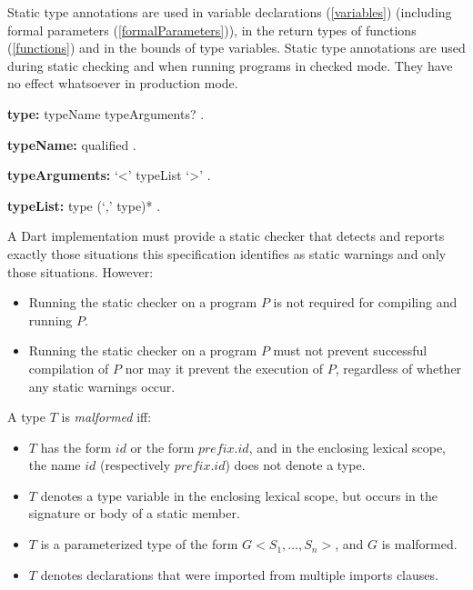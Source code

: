 \documentclass{article}
\begin{document}
\LMHash{}
Static type annotations are used in variable declarations (\ref{variables}) (including formal parameters (\ref{formalParameters})), in the return types of functions (\ref{functions}) and in the bounds of type variables.  Static type annotations are used during static  checking and when running programs in checked mode. They have no effect whatsoever in production mode.

 \begin{grammar}
{\bf type:}
      typeName typeArguments?
    .

{\bf typeName:}
      qualified
    .

{\bf typeArguments:}
      `<' typeList `>'
    .

{\bf typeList:}
      type (`,' type)*
    .
 \end{grammar}

\LMHash{}
A Dart implementation must provide a static checker that detects and reports exactly those situations this specification identifies as static warnings and only those situations. However:
\begin{itemize}
\item Running  the static checker on a program $P$ is not required for compiling and running $P$.
\item Running the static checker on a program $P$ must not prevent successful compilation of $P$ nor may it prevent the execution of $P$, regardless of whether any static warnings occur.
\end{itemize}



\LMHash{}
A type $T$ is {\em malformed} iff:
\begin{itemize}
\item $T$ has the form $id$ or the form $prefix.id$, and in the enclosing lexical scope, the name $id$ (respectively $prefix.id$) does not denote a type.
\item $T$ denotes a type variable in the enclosing lexical scope, but occurs in the signature or body of a static member.
\item $T$ is a parameterized type of the form $G<S_1, \ldots , S_n>$, and  $G$ is malformed.
\item $T$ denotes declarations that were imported from multiple imports clauses.
\end{itemize}
\end{document}
